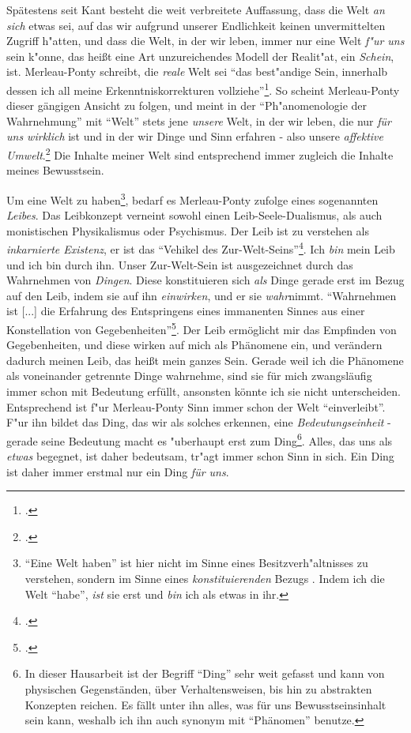 \documentclass[a4paper, 12pt]{article}
\begin{document}
\begin{onehalfspace}
\noindent Spätestens seit Kant besteht die weit verbreitete Auffassung, dass die Welt \emph{an sich} etwas sei, auf das wir aufgrund unserer Endlichkeit keinen unvermittelten Zugriff h"atten, und dass die Welt, in der wir leben, immer nur eine Welt \emph{f"ur uns} sein k"onne, das heißt eine Art unzureichendes Modell der Realit"at, ein \emph{Schein}, ist. Merleau-Ponty schreibt, die \emph{reale} Welt sei "`das best"andige Sein, innerhalb dessen ich all meine Erkenntniskorrekturen vollziehe"'\footnote{\Cite[Siehe][S. 379]{merleau1966phanomenologie}.}. So scheint Merleau-Ponty dieser gängigen Ansicht zu folgen, und meint in der "`Ph"anomenologie der Wahrnehmung"' mit "`Welt"' stets jene \emph{unsere} Welt, in der wir leben, die nur \emph{für uns wirklich} ist und in der wir Dinge und Sinn erfahren - also unsere \emph{affektive Umwelt}.\footnote{\Cite[Vgl.][S. 185]{merleau1966phanomenologie}.} Die Inhalte meiner Welt sind entsprechend immer zugleich die Inhalte meines Bewusstsein.

Um eine Welt zu haben\footnote{"`Eine Welt haben"' ist hier nicht im Sinne eines Besitzverh"altnisses zu verstehen, sondern im Sinne eines \emph{konstituierenden} Bezugs . Indem ich die Welt "`habe"', \emph{ist} sie erst und \emph{bin} ich als etwas in ihr.}, bedarf es Merleau-Ponty zufolge eines sogenannten \emph{Leibes}. Das Leibkonzept verneint sowohl einen Leib-Seele-Dualismus, als auch monistischen Physikalismus oder Psychismus. Der Leib ist zu verstehen als \emph{inkarnierte Existenz}, er ist das "`Vehikel des Zur-Welt-Seins"'\footnote{\Cite[Siehe][S. 106]{merleau1966phanomenologie}.}. Ich \emph{bin} mein Leib und ich bin durch ihn. Unser Zur-Welt-Sein ist ausgezeichnet durch das Wahrnehmen von \emph{Dingen}. Diese konstituieren sich \emph{als} Dinge gerade erst im Bezug auf den Leib, indem sie auf ihn \emph{einwirken}, und er sie \emph{wahr}nimmt. "`Wahrnehmen ist [...] die Erfahrung des Entspringens eines immanenten Sinnes aus einer Konstellation von Gegebenheiten"'\footnote{\Cite[Siehe][S. 42]{merleau1966phanomenologie}.}. Der Leib ermöglicht mir das Empfinden von Gegebenheiten, und diese wirken auf mich als Phänomene ein, und verändern dadurch meinen Leib, das heißt mein ganzes Sein. Gerade weil ich die Phänomene als voneinander getrennte Dinge wahrnehme, sind sie für mich zwangsläufig immer schon mit Bedeutung erfüllt, ansonsten könnte ich sie nicht unterscheiden. Entsprechend ist f"ur Merleau-Ponty Sinn immer schon der Welt "`einverleibt"'. F"ur ihn bildet das Ding, das wir als solches erkennen, eine \emph{Bedeutungseinheit} - gerade seine Bedeutung macht es "uberhaupt erst zum Ding\footnote{In dieser Hausarbeit ist der Begriff "`Ding"' sehr weit gefasst und kann von physischen Gegenständen, über Verhaltensweisen, bis hin zu abstrakten Konzepten reichen. Es fällt unter ihn alles, was für uns Bewusstseinsinhalt sein kann, weshalb ich ihn auch synonym mit "`Phänomen"' benutze.}. Alles, das uns als \emph{etwas} begegnet, ist daher bedeutsam, tr"agt immer schon Sinn in sich. Ein Ding ist daher immer erstmal nur ein Ding \emph{für uns}.


\end{onehalfspace}
\end{document}
